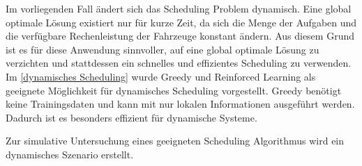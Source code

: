 Im vorliegenden Fall ändert sich das Scheduling Problem dynamisch. Eine global optimale Lösung existiert nur für kurze Zeit, da sich die Menge der Aufgaben und die verfügbare Rechenleistung der Fahrzeuge konstant ändern. Aus diesem Grund ist es für diese Anwendung sinnvoller, auf eine global optimale Lösung zu verzichten und stattdessen ein schnelles und effizientes Scheduling zu verwenden. Im \autoref{dynamisches Scheduling} wurde Greedy und Reinforced Learning als geeignete Möglichkeit für dynamisches Scheduling vorgestellt. Greedy benötigt keine Trainingsdaten und kann  mit nur lokalen Informationen ausgeführt werden. Dadurch ist es besonders effizient für dynamische Systeme.

Zur simulative Untersuchung eines geeigneten Scheduling Algorithmus wird ein dynamisches Szenario erstellt. 

